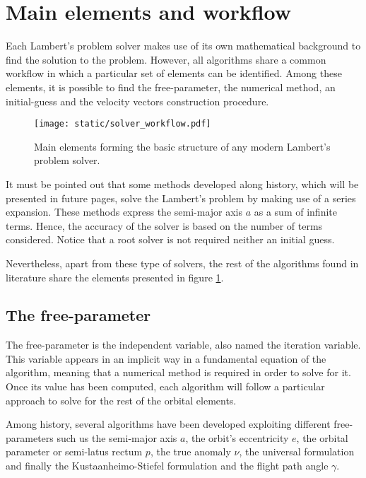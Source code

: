 \section{Main elements and workflow}

Each Lambert's problem solver makes use of its own mathematical background to
find the solution to the problem. However, all algorithms share a common
workflow in which a particular set of elements can be identified. Among these
elements, it is possible to find the free-parameter, the numerical method, an
initial-guess and the velocity vectors construction procedure.

\vspace{0.5cm}
\begin{figure}[h]
  \centering
  \texttt{[image: static/solver\_workflow.pdf]}
  \caption[Basic solver elements and structure]{Main elements forming the basic structure of any modern Lambert's
    problem solver.}
  \label{fig:solver_elements}
\end{figure}

It must be pointed out that some methods developed along history, which will be
presented in future pages, solve the Lambert's problem by making use of a series
expansion. These methods express the semi-major axis $a$ as a sum of infinite
terms. Hence, the accuracy of the solver is based on the number of
terms considered. Notice that a root solver is not required neither an initial
guess.

Nevertheless, apart from these type of solvers, the rest of the algorithms found
in literature share the elements presented in figure \ref{fig:solver_elements}.

\subsection{The free-parameter}

The free-parameter is the independent variable, also named the iteration
variable. This variable appears in an implicit way in a fundamental equation of
the algorithm, meaning that a numerical method is required in order to solve for
it. Once its value has been computed, each algorithm will follow a particular
approach to solve for the rest of the orbital elements.

Among history, several algorithms have been developed exploiting different
free-parameters such us the semi-major axis $a$, the orbit's eccentricity $e$,
the orbital parameter or semi-latus rectum $p$, the true anomaly $\nu$, the
universal formulation and finally the Kustaanheimo-Stiefel formulation and the
flight path angle $\gamma$.

